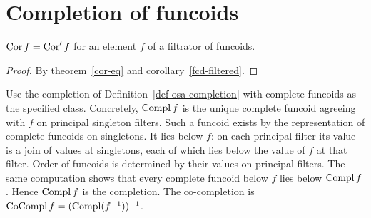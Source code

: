 \section{Completion of funcoids}
\begin{thm}
$\operatorname{Cor} f=\operatorname{Cor}'f$ for an element $f$ of a filtrator of funcoids.\end{thm}
\begin{proof}
By theorem~\ref{cor-eq} and corollary~\ref{fcd-filtered}.\end{proof}
Use the completion of Definition~\ref{def-osa-completion} with
complete funcoids as the specified class. Concretely, $\operatorname{Compl} f$ is
the unique complete funcoid agreeing with $f$ on principal
singleton filters. Such a funcoid exists by the representation of
complete funcoids on singletons. It lies below $f$: on each
principal filter its value is a join of values at singletons,
each of which lies below the value of $f$ at that filter.
Order of funcoids is determined by their values on principal filters.
The same computation shows that every complete funcoid below $f$
lies below $\operatorname{Compl} f$. Hence $\operatorname{Compl} f$ is the completion.
The co-completion is $\operatorname{CoCompl} f=(\operatorname{Compl}(f^{-1}))^{-1}$.


